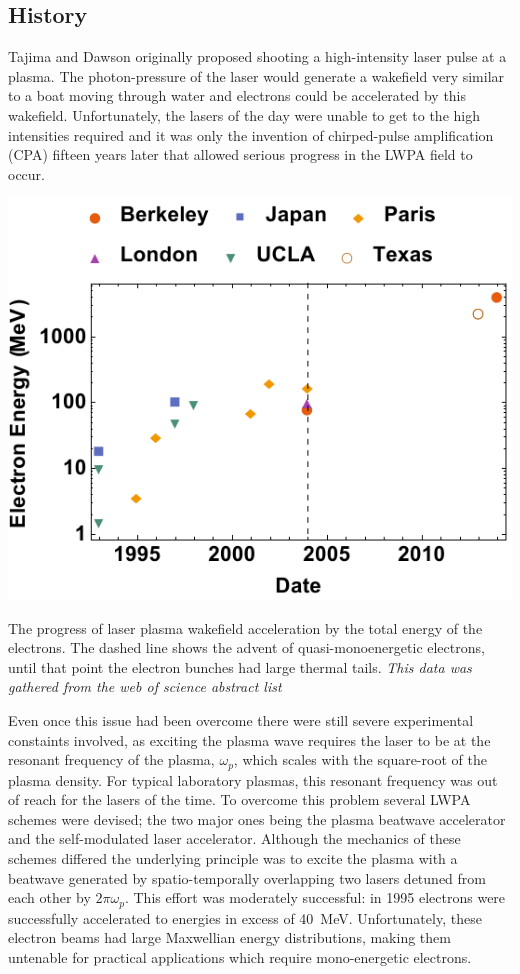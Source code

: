\documentclass[12pt,letter]{article}
\begin{document}
 \subsection{History}
 \label{sec:history}
Tajima and Dawson originally proposed shooting a high-intensity laser pulse at a
 plasma\cite{PhysRevLett.43.267}. The photon-pressure of the laser would generate a wakefield very similar to a boat moving
 through water and electrons could be accelerated by this wakefield.
  Unfortunately, the lasers of the day were unable to get
 to the high intensities required and it was only the invention of 
 chirped-pulse amplification (CPA) fifteen years later that allowed serious progress in
 the LWPA field to occur\cite{backus1998high}.
\begin{marginfigure}
	\includegraphics[width=\marginparwidth]{../figures/datfig.pdf}
    \caption{\label{fig:progress}The progress of laser plasma wakefield acceleration by the total
    energy of the electrons. The dashed line shows the advent of
    quasi-monoenergetic electrons, until that point the electron bunches had
    large thermal tails. \em This data was gathered from the web of science
abstract list}
\end{marginfigure}Even once this issue had been overcome there were still severe experimental constaints involved, as exciting the plasma wave
requires the laser to be at the resonant frequency of the plasma, $\omega_p$, which scales with the square-root of the plasma density. For typical
laboratory plasmas, this resonant frequency was out of reach for the lasers of
the time. To overcome this problem several LWPA schemes were devised; the two major ones being the plasma beatwave accelerator and the
self-modulated laser accelerator. Although the mechanics of these schemes differed the
underlying principle was to excite the plasma with a beatwave generated by spatio-temporally
overlapping two lasers detuned from each other by $2\pi\omega_p$. This effort was moderately
successful: in 1995 electrons were successfully accelerated to energies in excess
of \SI{40}{\mega\electronvolt}\cite{}. Unfortunately, these electron beams had large
Maxwellian energy distributions, making them untenable for practical
applications which require mono-energetic electrons.
\end{document}

